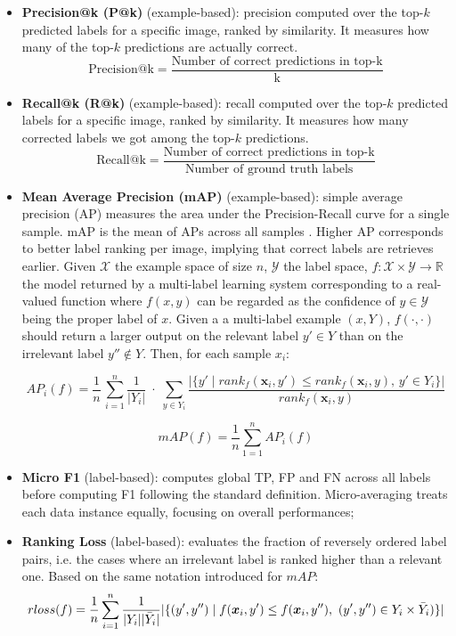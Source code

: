 \documentclass[a4paper, oneside, english]{sapthesis} %
\begin{document}
\begin{itemize}
    \item \textbf{Precision@k (P@k)} (example-based): precision computed over the top-$k$ predicted labels for a specific image, ranked by similarity. It measures how many of the top-$k$ predictions are actually correct.
    $$
    \text{Precision@k} = \frac{\text{Number of correct predictions in top-k}}{\text{k}}
    $$
    \item \textbf{Recall@k (R@k)} (example-based): recall computed over the top-$k$ predicted labels for a specific image, ranked by similarity. It measures how many corrected labels we got among the top-$k$ predictions.
    $$
    \text{Recall@k} = \frac{\text{Number of correct predictions in top-k}}{\text{Number of ground truth labels}}
    $$
    \item \textbf{Mean Average Precision (mAP)} (example-based): simple average precision (AP) measures the area under the Precision-Recall curve for a single sample. mAP is the mean of APs across all samples \cite{zhang2013review}. Higher AP corresponds to better label ranking per image, implying that correct labels are retrieves earlier. Given $\mathcal{X}$ the example space of size $n$, $\mathcal{Y}$ the label space, $f:\mathcal{X} \times \mathcal{Y} \to \mathbb{R}$ the model returned by a multi-label learning system corresponding to a real-valued function where $f(x, y)$ can be regarded as the confidence of $y \in \mathcal{Y}$ being the proper label of $x$. Given a a multi-label example $(x, Y)$, $f(\cdot, \cdot)$ should return a larger output on the relevant label $y' \in Y$ than on the irrelevant label $y'' \not\in Y$. Then, for each sample $x_i$:

    $$
    AP_i(f)=\frac {1}{n} \,\sum _{i=1}^n \frac {1}{|Y_i|} \;\cdot\;\sum \limits _{y\in Y_i}\frac {|\{y'\mid rank_f({\boldsymbol x}_i,y')\leq rank_f({\boldsymbol x}_i,y),\,y'\in Y_i\}|}{rank_f({\boldsymbol x}_i,y)}
    $$

    $$
    mAP(f) = \frac{1}{n} \sum_{1=1}^n AP_i (f)
    $$
    
    \item \textbf{Micro F1} (label-based): computes global TP, FP and FN across all labels before computing F1  following the standard definition. Micro-averaging treats each data instance equally, focusing on overall performances;
    
    \item \textbf{Ranking Loss} (label-based): evaluates the fraction of reversely ordered label pairs, i.e. the cases where an irrelevant label is ranked higher than a relevant one. Based on the same notation introduced for $mAP$:
    $$
    rloss(f)=\frac {1}{n}\sum _{i=1}^n \frac {1}{|Y_i| |\bar Y_i|}|\{(y',y'')\mid f({\boldsymbol x}_i,y')\\ \leq f({\boldsymbol x}_i,y''),~(y',y'')\in Y_i\times \bar Y_i)\}|
    $$
    

\end{itemize}
\end{document}
